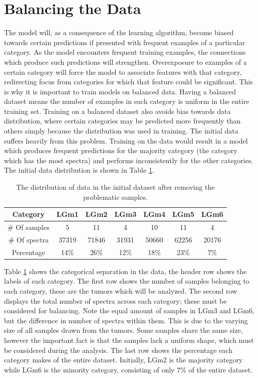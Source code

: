 \section{Balancing the Data}
The model will, as a consequence of the learning algorithm, become biased towards certain predictions if presented with frequent examples of a particular category. As the model encounters frequent training examples, the connections which produce such predictions will strengthen. Overexposure to examples of a certain category will force the model to associate features with that category, redirecting focus from categories for which that feature could be significant. This is why it is important to train models on balanced data. Having a balanced dataset means the number of examples in each category is uniform in the entire training set. Training on a balanced dataset also avoids bias towards data distribution, where certain categories may be predicted more frequently than others simply because the distribution was used in training. The initial data suffers heavily from this problem. Training on the data would result in a model which produces frequent predictions for the majority category (the category which has the most spectra) and performs inconsistently for the other categories. The initial data distribution is shown in Table \ref{table:1}.

\begin{table}[htb]
\centering
 \begin{tabular}{||c c c c c c c||} 
 \hline
 Category & LGm1 & LGm2 & LGm3 & LGm4 & LGm5 & LGm6 \\ [0.5ex] 
 \hline\hline
 \# Of samples & 5& 11 & 4 & 10 & 11 & 4 \\ 
 \hline
 \# Of spectra & 37319 & 71846 & 31931 & 50660 & 62256 & 20176 \\
 \hline
 Percentage & 14\%& 26\% & 12\% & 18\% & 23\% & 7\% \\
 \hline

\end{tabular}
\caption{The distribution of data in the initial dataset after removing the problematic samples.}
\label{table:1}
\end{table}

Table \ref{table:1} shows the categorical separation in the data, the header row shows the labels of each category. The first row shows the number of samples belonging to each category, these are the tumors which will be analyzed. The second row displays the total number of spectra across each category; these must be considered for balancing. Note the equal amount of samples in LGm3 and LGm6, but the difference in number of spectra within them. This is due to the varying size of all samples drawn from the tumors. Some samples share the same size, however the important fact is that the samples lack a uniform shape, which must be considered during the analysis. The last row shows the percentage each category makes of the entire dataset. Initially, LGm2 is the majority category while LGm6 is the minority category, consisting of only $7$\% of the entire dataset.

